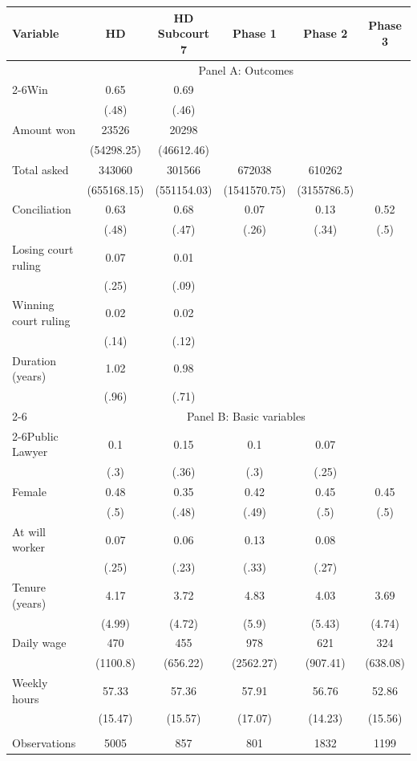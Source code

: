 \begin{tabular}{lccccc}
\toprule
Variable & HD    & HD Subcourt 7 & Phase 1 & Phase 2 & Phase 3 \\
\midrule
\midrule
      & \multicolumn{5}{c}{Panel A: Outcomes} \\
\cmidrule{2-6}Win   & 0.65  & 0.69  &       &       &  \\
      & (.48) & (.46) &       &       &  \\
Amount won & 23526 & 20298 &       &       &  \\
      & (54298.25) & (46612.46) &       &       &  \\
Total asked & 343060 & 301566 & 672038 & 610262 &  \\
      & (655168.15) & (551154.03) & (1541570.75) & (3155786.5) &  \\
Conciliation  & 0.63  & 0.68  & 0.07  & 0.13  & 0.52 \\
      & (.48) & (.47) & (.26) & (.34) & (.5) \\
Losing court ruling  & 0.07  & 0.01  &       &       &  \\
      & (.25) & (.09) &       &       &  \\
Winning court ruling & 0.02  & 0.02  &       &       &  \\
      & (.14) & (.12) &       &       &  \\
Duration (years) & 1.02  & 0.98  &       &       &  \\
      & (.96) & (.71) &       &       &  \\
\cmidrule{2-6}      & \multicolumn{5}{c}{Panel B: Basic variables} \\
\cmidrule{2-6}Public Lawyer & 0.1   & 0.15  & 0.1   & 0.07  &  \\
      & (.3)  & (.36) & (.3)  & (.25) &  \\
Female & 0.48  & 0.35  & 0.42  & 0.45  & 0.45 \\
      & (.5)  & (.48) & (.49) & (.5)  & (.5) \\
At will worker & 0.07  & 0.06  & 0.13  & 0.08  &  \\
      & (.25) & (.23) & (.33) & (.27) &  \\
Tenure (years) & 4.17  & 3.72  & 4.83  & 4.03  & 3.69 \\
      & (4.99) & (4.72) & (5.9) & (5.43) & (4.74) \\
Daily wage & 470   & 455   & 978   & 621   & 324 \\
      & (1100.8) & (656.22) & (2562.27) & (907.41) & (638.08) \\
Weekly hours & 57.33 & 57.36 & 57.91 & 56.76 & 52.86 \\
      & (15.47) & (15.57) & (17.07) & (14.23) & (15.56) \\
      &       &       &       &       &  \\
\midrule
Observations & 5005  & 857   & 801   & 1832  & 1199 \\
\bottomrule
\bottomrule
\end{tabular}%
